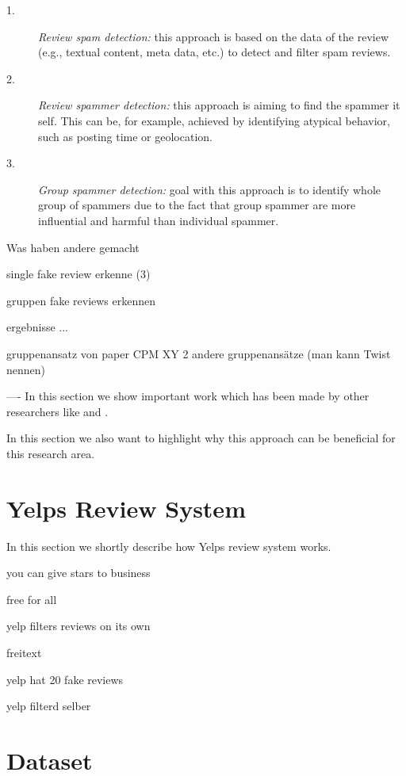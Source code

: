 \documentclass[conference]{IEEEtran}  %
\theoremstyle{plain}
\theoremstyle{definition}
\theoremstyle{remark}
\begin{document}
\begin{description}
\item[1.]
\textit{Review spam detection:} this approach is based on the data of the review (e.g., textual content, meta data, etc.) to detect and filter spam reviews. %
\item[2.]  
\textit{Review spammer detection:} this approach is aiming to find the spammer it self. This can be, for example, achieved by identifying atypical behavior, such as posting time or geolocation. %
\item[3.]
\textit{Group spammer detection:} goal with this approach is to identify whole group of spammers due to the fact that group spammer are more influential and harmful than individual spammer.  %

\end{description}

Was haben andere gemacht

single fake review erkenne (3)

gruppen fake reviews erkennen

ergebnisse ...

gruppenansatz von paper CPM XY
2 andere gruppenansätze
(man kann Twist nennen)


----
In this section we show important work which has been made by other researchers like 
\cite{mukherjee2013spotting} and \cite{choo2015detecting}.

In this section we also want to highlight why this approach can be beneficial for this research area. 

\section{Yelps Review System}
\label{sec:Yelps review_system}

In this section we shortly describe how Yelps review system works. 

you can give stars to business

free for all

yelp filters reviews on its own

freitext

yelp hat 20 fake reviews

yelp filterd selber


\section{Dataset}
\label{sec:dataset}
\end{document}
